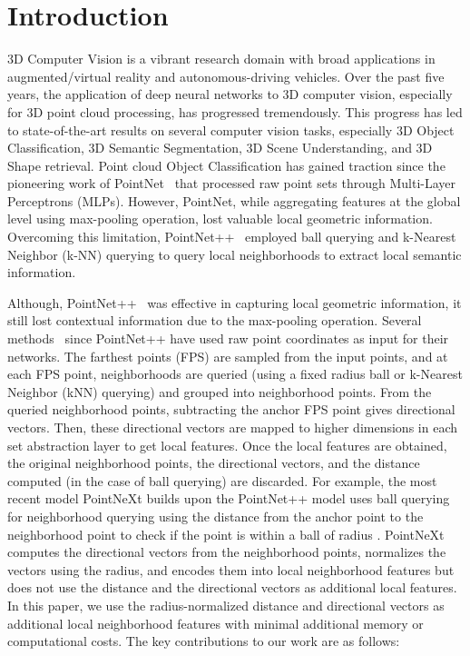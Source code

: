 \documentclass[runningheads]{llncs}
\begin{document}
\section{Introduction}
3D Computer Vision is a vibrant research domain with broad applications in augmented/virtual reality and autonomous-driving vehicles. Over the past five years, the application of deep neural networks to 3D computer vision, especially for 3D point cloud processing, has progressed tremendously. This progress has led to state-of-the-art results on several computer vision tasks, especially 3D Object Classification, 3D Semantic Segmentation, 3D Scene Understanding, and 3D Shape retrieval. \hfill\break
\indent Point cloud Object Classification has gained traction since the pioneering work of PointNet~\cite{qi2017pointnet} that processed raw point sets through Multi-Layer Perceptrons (MLPs). However, PointNet, while aggregating features at the global level using max-pooling operation, lost valuable local geometric information. Overcoming this limitation, PointNet++~\cite{qi2017pointnet++} employed ball querying and k-Nearest Neighbor (k-NN) querying to query local neighborhoods to extract local semantic information. 

\indent Although, PointNet++~\cite{qi2017pointnet++} was effective in capturing local geometric information, it still lost contextual information due to the max-pooling operation. Several methods~\cite{qi2017pointnet++,liu2019relation,hua2018pointwise,duan2019structural,liu2019densepoint,xu2020geometry,lan2019modeling} since PointNet++ have used raw  point coordinates as input for their networks. The farthest points (FPS) are sampled from the input points, and at each FPS point, neighborhoods are queried (using a fixed radius ball or k-Nearest Neighbor (kNN) querying) and grouped into neighborhood points. From the queried neighborhood points, subtracting the anchor FPS point gives directional vectors. Then, these directional vectors are mapped to higher dimensions in each set abstraction layer to get local features. Once the local features are obtained, the original neighborhood points, the directional vectors, and the distance computed (in the case of ball querying) are discarded. For example, the most recent model PointNeXt builds upon the PointNet++ model uses ball querying for neighborhood querying using the distance from the anchor point to the neighborhood point to check if the point is within a ball of radius . PointNeXt computes the directional vectors from the neighborhood points, normalizes the vectors using the radius, and encodes them into local neighborhood features but does not use the distance and the directional vectors as additional local features. In this paper, we use the radius-normalized distance and directional vectors as additional local neighborhood features with minimal additional memory or computational costs. The key contributions to our work are as follows:
\end{document}
